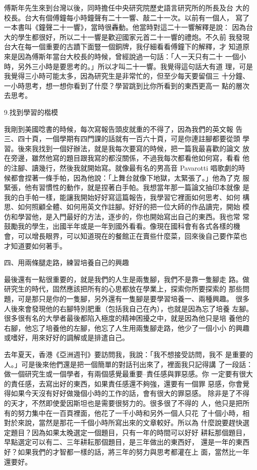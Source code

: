 傅斯年先生來到台灣以後，同時擔任中央研究院歷史語言研究所的所長及台
大的校長。台大有個傅鐘每小時鐘聲有二十一響、敲二十一次。以前有一個人，
寫了一本書叫《鐘聲二十一響》，當時很轟動。他當時對這二十一響解釋是說：
因為台大的學生都很好，所以二十一響是歡迎國家元首二十一響的禮炮。不久前
我發現台大在每一個重要的古蹟下面豎一個銅牌，我仔細看看傅鐘下的解釋，才
知道原來是因為傅斯年當台大校長的時候，曾經說過一句話：「人一天只有二十
一個小時，另外三小時是要思考的。」所以才叫二十一響。我覺得這句話大有道
理，可是我覺得三小時可能太多，因為研究生是非常忙的，但至少每天要留個三
十分鐘、一小時思考，想一想你看到了什麼？學習跳到比你所看到的東西更高一
點的層次去思考。 

9.找到學習的楷模

我剛到美國唸書的時候，每次寫報告頭皮就重的不得了，因為我們的英文報
告三、四十頁，一個學期有四門課的話就有一百六十頁，可是你連註腳都要從頭
學習。後來我找到一個好辦法，就是我每次要寫的時候，把一篇我最喜歡的論文
放在旁邊，雖然他寫的題目跟我寫的都沒關係，不過我每次都看他如何寫，看看
他的注腳、讀幾行，然後我就開始寫。就像最有名的男高音 Pavarotti 唱歌劇的時
候都會捏著一條手帕，因為他說：「上舞台就像下地獄，太緊張了。」他為了克
服緊張，他有習慣性的動作，就是捏著白手帕。我想當年那一篇論文抽印本就像
是我的白手帕一樣，能讓我開始好好寫這篇報告，我學習它裡面如何思考、如何
構思、如何照顧全體、如何用英文作註腳。好好的把一位大師的作品讀完，開始
模仿和學習他，是入門最好的方法，逐步的，你也開始寫出自己的東西。我也常
常鼓勵我的學生，出國半年或是一年到國外看看。像現在國科會有各式各樣的機
會，可以增長眼界，可以知道現在的餐館正在賣些什麼菜，回來後自己要作菜也
才知道要如何著手。

四、用兩條腿走路，練習培養自己的興趣

 最後還有一點很重要的，就是我們的人生是兩隻腳，我們不是靠一隻腳走
路。做研究生的時代，固然應該把所有的心思都放在學業上，探索你所要探索的
那些問題，可是那只是你的一隻腳，另外還有一隻腳是要學習培養一、兩種興趣。
很多人後來會發現他的右腳特別肥重（包括我自己在內），也就是因為忘了培養
左腳。很多很有名的大學者最後都陷入極度的精神困擾之中，就是因為他只是培
養他的右腳，他忘了培養他的左腳，他忘了人生用兩隻腳走路，他少了一個小小
的興趣或嗜好，用來好好的調解或是排遣自己。

 去年夏天，香港《亞洲週刊》要訪問我，我說：「我不想接受訪問，我不
是重要的人。」可是後來他們還是把一個簡單的對話刊出來了，裡面我只記得講
了一段話：做一個研究生或一個學者，有兩個感覺最重要--責任感與罪惡感。你
一定要有很大的責任感，去寫出好的東西，如果責任感還不夠強，還要有一個罪
惡感，你會覺得如果今天沒有好好做幾個小時的工作的話，會有很大的罪惡感。
除非是了不得的天才，不然即使愛因斯坦也是需要很努力的。很多很了不得的
人，他只是把所有的努力集中在一百頁裡面，他花了一千小時和另外一個人只花
了十個小時，相對於來說，當然是那花一千個小時所寫出來的文章較好。所以為
什麼說要趕快選定題目？因為如果太晚選定一個題目，只有一年的時間可以好好
耕耘那個題目，早點選定可以有二、三年耕耘那個題目，是三年做出的東西好，
還是一年的東西好？如果我們的才智都一樣的話，將三年的努力與思考都灌在上
面，當然比一年還要好。 

